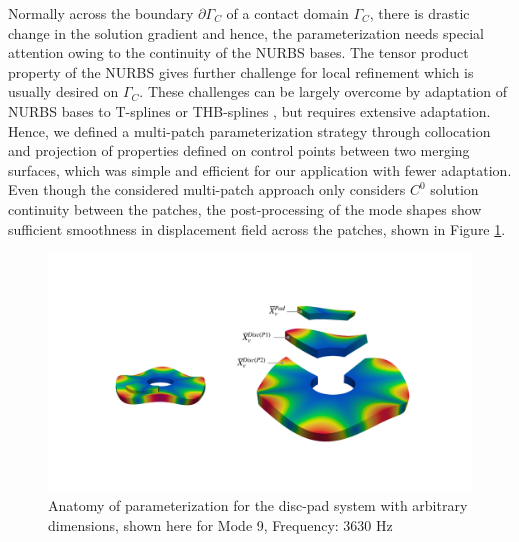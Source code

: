  Normally across the boundary $\partial\Gamma_C$ of a contact domain $\Gamma_C$, there is drastic change in the solution gradient and hence, the parameterization needs special attention owing to the continuity of the NURBS bases. The tensor product property of the NURBS gives further challenge for local refinement which is usually desired on $\Gamma_C$. These challenges can be largely overcome by adaptation of NURBS bases to T-splines \citep{BAZILEVS2010229} or THB-splines \citep{GIANNELLI2012485}, but requires extensive adaptation. Hence, we defined a multi-patch parameterization strategy through collocation and projection of  properties defined on control points between two merging surfaces, which was simple and efficient for our application with fewer adaptation. Even though the considered multi-patch approach only considers $C^0$ solution continuity between the patches, the post-processing of the mode shapes show sufficient smoothness in displacement field across the patches, shown in Figure \ref{fig:MP_anatom}.\\

\begin{figure}[h!]
    \centering
    \includegraphics[scale=0.28]{Chapter5/Pictures/MP.pdf}
    \caption{Anatomy of parameterization for the disc-pad system with arbitrary dimensions, shown here for Mode 9, Frequency: 3630 Hz}
    \label{fig:MP_anatom}
\end{figure}

